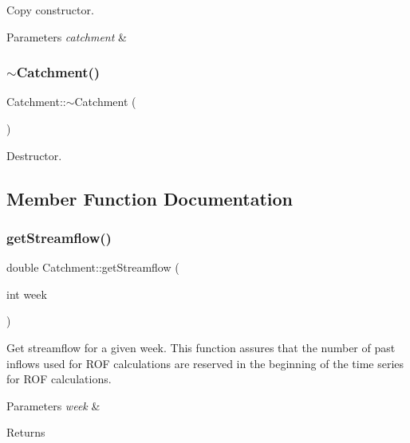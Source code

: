 Copy constructor. 
\begin{DoxyParams}{Parameters}
{\em catchment} & \\
\hline
\end{DoxyParams}
\mbox{\label{classCatchment_a7c8073fc1dd2e2fa9fa8bfc68ce120bd}} 
\subsubsection{\texorpdfstring{$\sim$\+Catchment()}{~Catchment()}}
{\footnotesize\ttfamily Catchment\+::$\sim$\+Catchment (\begin{DoxyParamCaption}{ }\end{DoxyParamCaption})\hspace{0.3cm}{\ttfamily [virtual]}}

Destructor. 

\subsection{Member Function Documentation}
\mbox{\label{classCatchment_af4e8206ffab5c901e5e4cdd6136f73a1}} 
\subsubsection{\texorpdfstring{get\+Streamflow()}{getStreamflow()}}
{\footnotesize\ttfamily double Catchment\+::get\+Streamflow (\begin{DoxyParamCaption}\item[{int}]{week }\end{DoxyParamCaption})}

Get streamflow for a given week. This function assures that the number of past inflows used for R\+OF calculations are reserved in the beginning of the time series for R\+OF calculations. 
\begin{DoxyParams}{Parameters}
{\em week} & \\
\hline
\end{DoxyParams}
\begin{DoxyReturn}{Returns}

\end{DoxyReturn}
\mbox{\label{classCatchment_a66d0f20f34893ea2df589e5cbce31fc4}} 
